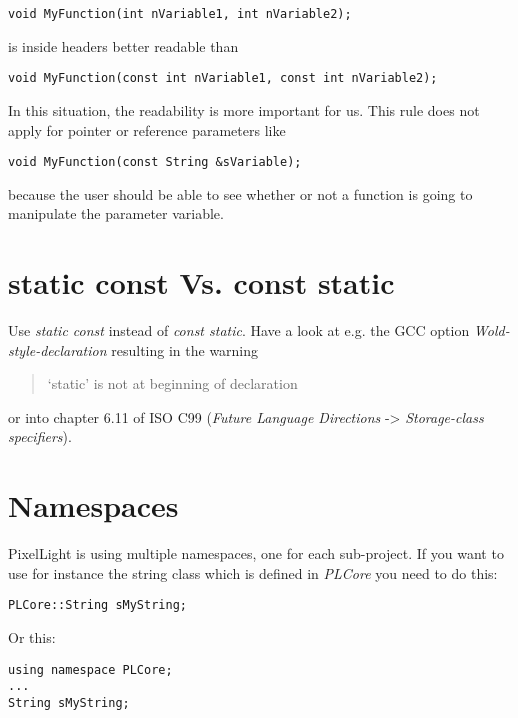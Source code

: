 \begin{lstlisting}[caption=Function parameters]
void MyFunction(int nVariable1, int nVariable2);
\end{lstlisting}

is inside headers better readable than

\begin{lstlisting}[caption=Constant function parameters]
void MyFunction(const int nVariable1, const int nVariable2);
\end{lstlisting}

In this situation, the readability is more important for us. This rule does not apply for pointer or reference parameters like

\begin{lstlisting}[caption=Constant function pointer/reference parameter]
void MyFunction(const String &sVariable);
\end{lstlisting}

because the user should be able to see whether or not a function is going to manipulate the parameter variable.




\section{static const Vs. const static}
Use \emph{static const} instead of \emph{const static}. Have a look at e.g. the \ac{GCC} option \emph{Wold-style-declaration} resulting in the warning \begin{quote}`static' is not at beginning of declaration\end{quote} or into chapter 6.11 of ISO C99 (\emph{Future Language Directions} -> \emph{Storage-class specifiers}).




\section{Namespaces}
PixelLight is using multiple namespaces, one for each sub-project. If you want to use for instance the string class which is defined in \emph{PLCore} you need to do this:

\begin{lstlisting}[caption=Explicit namespace]
PLCore::String sMyString;
\end{lstlisting}

Or this:

\begin{lstlisting}[caption=Using namespace]
using namespace PLCore;
...
String sMyString;
\end{lstlisting}


